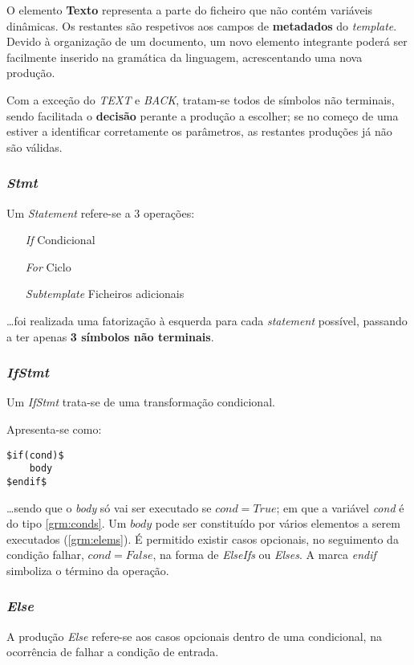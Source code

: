 \documentclass[../relatorio.tex]{subfiles}
\begin{document}
O elemento \textbf{Texto} representa a parte do 
ficheiro que não contém variáveis dinâmicas.
Os restantes são respetivos aos campos de \textbf{metadados}
do \textit{template}.
Devido à organização de um documento, um novo elemento integrante 
poderá ser facilmente inserido
na gramática da linguagem, acrescentando uma nova produção.

Com a exceção do \textit{TEXT} e \textit{BACK},
tratam-se todos de símbolos não terminais, sendo facilitada
o \textbf{decisão} perante a produção a escolher; se no começo 
de uma estiver a identificar corretamente os parâmetros, 
as restantes produções já não são válidas.

\subsubsection{\textit{Stmt}}\label{grm:stmt}
Um \textit{Statement} refere-se a 3 operações:
\begin{enumerate}
    \item[\textit{If}]         {Condicional}
    \item[\textit{For}]        {Ciclo}
    \item[\textit{Subtemplate}]{Ficheiros adicionais}
\end{enumerate}
\dots foi realizada uma fatorização à esquerda para cada 
\textit{statement} possível, passando a ter apenas 
\textbf{3 símbolos não terminais}.

\subsubsection{\textit{IfStmt}} \label{grm:ifstmt}
Um \textit{IfStmt} trata-se de uma transformação
condicional.

Apresenta-se como:
\begin{verbatim}    
$if(cond)$
    body
$endif$
\end{verbatim}
\dots sendo que o \textit{body} só vai ser executado
se $cond=True$; em que a variável \textit{cond} é do 
tipo \ref{grm:conds}.
Um $body$ pode ser constituído por 
vários elementos a serem executados (\ref{grm:elems}).
É permitido existir casos opcionais, 
no seguimento da condição falhar, 
$cond=False$, na forma de \textit{ElseIfs} ou \textit{Elses}.
A marca \textit{endif} simboliza o término da operação.

\subsubsection{\textit{Else}} \label{grm:else}
A produção \textit{Else} refere-se aos casos opcionais 
dentro de uma condicional, na ocorrência de falhar a 
condição de entrada.
\end{document}
